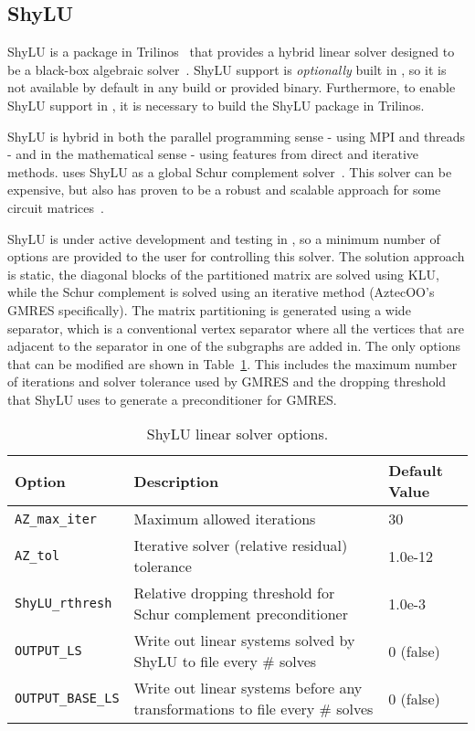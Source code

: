 \subsection{ShyLU}
\label{HybridLinearSolver_Options}
ShyLU is a package in Trilinos~\cite{trilinos:toms} that provides a hybrid linear solver 
designed to be a black-box algebraic solver~\cite{ShyLU-IPDPS}. 
ShyLU support is {\it optionally} built in \Xyce{},
so it is not available by default in any \Xyce{} build or provided binary.
Furthermore, to enable ShyLU support in \Xyce{}, it is necessary to build 
the ShyLU package in Trilinos.

ShyLU is hybrid in both the
parallel programming sense - using MPI and threads - and in the mathematical
sense - using features from direct and iterative methods. \Xyce{} uses ShyLU as a global
Schur complement solver~\cite{Saad:2003:IMSLS}.  This solver can be expensive, but also
has proven to be a robust and scalable approach for some circuit matrices~\cite{bomhof00}. 

ShyLU is under active development and testing in \Xyce{}, so a minimum number of options are 
provided to the user for controlling this solver.  The solution approach is static, 
the diagonal blocks of the partitioned matrix are solved using KLU, while the Schur complement 
is solved using an iterative method (AztecOO's GMRES specifically). 
The matrix partitioning is generated using a wide separator, which is a conventional 
vertex separator where all the vertices that are adjacent to the separator in one of the subgraphs
are added in.  The only options that can be modified are shown
in Table~\ref{tab:shylu:options}.  This includes the maximum number of iterations and solver tolerance
used by GMRES and the dropping threshold that ShyLU uses to generate a preconditioner for GMRES.

\begin{table}[htp]
\caption[ShyLU linear solver options.]{ShyLU linear solver options.}
\label{tab:shylu:options}
\begin{center}
\begin{tabular}{| p{3cm} | p{9cm} | p{2.5cm} |}
\hline
Option & Description & Default Value \\
\hline
{\tt AZ\_max\_iter}        & Maximum allowed iterations & 30 \\
{\tt AZ\_tol}              & Iterative solver (relative residual) tolerance & 1.0e-12 \\
{\tt ShyLU\_rthresh}       & Relative dropping threshold for Schur complement preconditioner & 1.0e-3 \\ 
{\tt OUTPUT\_LS}           & Write out linear systems solved by ShyLU to file every \# solves & 0 (false)\\
{\tt OUTPUT\_BASE\_LS}     & Write out linear systems before any transformations to file every \# solves & 0 (false)\\
\hline
\end{tabular}
\end{center}
\end{table}



